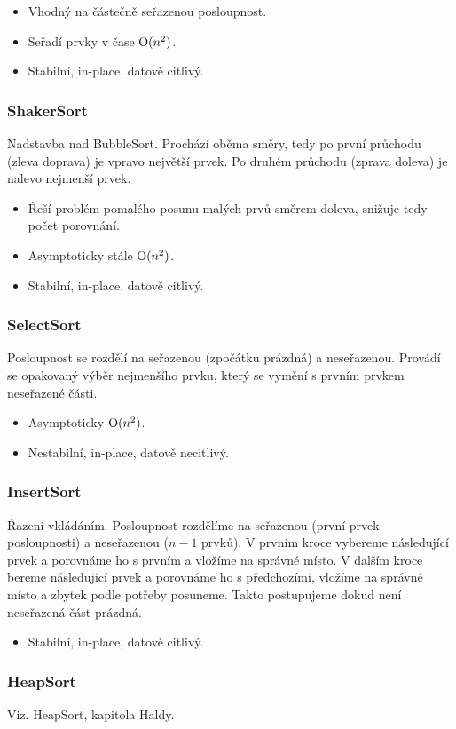       \begin{itemize}
        \item Vhodný na částečně seřazenou posloupnost.
        \item Seřadí prvky v čase $ \textrm O(n\textsuperscript{2})$.
        \item Stabilní, in-place, datově citlivý.
      \end{itemize}

    \subsubsection{ShakerSort}
      Nadstavba nad BubbleSort. Prochází oběma směry, tedy po první průchodu (zleva doprava) je vpravo největší prvek. Po druhém průchodu (zprava doleva) je nalevo nejmenší prvek.

      \begin{itemize}
        \item Řeší problém pomalého posunu malých prvů směrem doleva, snižuje tedy počet porovnání.
        \item Asymptoticky stále $ \textrm O(n\textsuperscript{2})$.
        \item Stabilní, in-place, datově citlivý.
      \end{itemize}

    \subsubsection{SelectSort}
      Posloupnost se rozdělí na seřazenou (zpočátku prázdná) a neseřazenou. Provádí se opakovaný výběr nejmenšího prvku, který se vymění s prvním prvkem neseřazené části.

      \begin{itemize}
        \item Asymptoticky $ \textrm O(n\textsuperscript{2})$.
        \item Nestabilní, in-place, datově necitlivý.
      \end{itemize}

    \subsubsection{InsertSort}
      Řazení vkládáním. Posloupnost rozdělíme na seřazenou (první prvek posloupnosti) a neseřazenou ($n - 1$ prvků).
      V prvním kroce vybereme následující prvek a porovnáme ho s prvním a vložíme na správné místo.
      V dalším kroce bereme následující prvek a porovnáme ho s předchozími, vložíme na správné místo a zbytek podle potřeby posuneme.
      Takto postupujeme dokud není neseřazená část prázdná.

      \begin{itemize}
        \item Stabilní, in-place, datově citlivý.
      \end{itemize}

    \subsubsection{HeapSort}
      Viz. HeapSort, kapitola Haldy.
